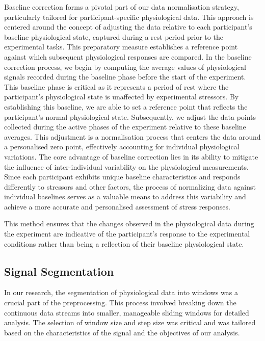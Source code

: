 Baseline correction forms a pivotal part of our data normalisation strategy, particularly tailored for participant-specific physiological data. This approach is centered around the concept of adjusting the data relative to each participant's baseline physiological state, captured during a rest period prior to the experimental tasks. This preparatory measure establishes a reference point against which subsequent physiological responses are compared.
In the baseline correction process, we begin by computing the average values of physiological signals recorded during the baseline phase before the start of the experiment. This baseline phase is critical as it represents a period of rest where the participant's physiological state is unaffected by experimental stressors. By establishing this baseline, we are able to set a reference point that reflects the participant's normal physiological state. Subsequently, we adjust the data points collected during the active phases of the experiment relative to these baseline averages. This adjustment is a normalisation process that centers the data around a personalised zero point, effectively accounting for individual physiological variations. The core advantage of baseline correction lies in its ability to mitigate the influence of inter-individual variability on the physiological measurements. Since each participant exhibits unique baseline characteristics and responds differently to stressors and other factors, the process of normalizing data against individual baselines serves as a valuable means to address this variability and achieve a more accurate and personalised assessment of stress responses.

This method ensures that the changes observed in the physiological data during the experiment are indicative of the participant's response to the experimental conditions rather than being a reflection of their baseline physiological state.

\subsection*{Signal Segmentation}
\label{sec:signal_segmentation}
In our research, the segmentation of physiological data into windows was a crucial part of the preprocessing. This process involved breaking down the continuous data streams into smaller, manageable sliding windows for detailed analysis. The selection of window size and step size was critical and was tailored based on the characteristics of the signal and the objectives of our analysis.

